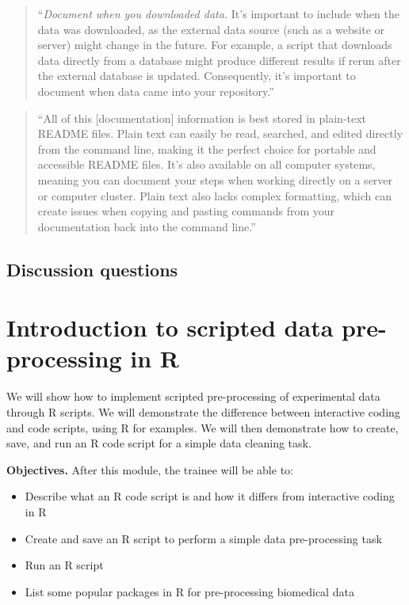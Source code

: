 \documentclass[]{tufte-book}
\providecommand{\tightlist}{%
  \setlength{\itemsep}{0pt}\setlength{\parskip}{0pt}}
\begin{document}
\begin{quote}
``\emph{Document when you downloaded data.} It's important to include when the data was downloaded,
as the external data source (such as a website or server) might change in the future. For example,
a script that downloads data directly from a database might produce different results if
rerun after the external database is updated. Consequently, it's important to document
when data came into your repository.'' \citep{buffalo2015bioinformatics}
\end{quote}

\begin{quote}
``All of this {[}documentation{]} information is best stored in plain-text README files.
Plain text can easily be read, searched, and edited directly from the command line,
making it the perfect choice for portable and accessible README files. It's also available
on all computer systems, meaning you can document your steps when working directly on
a server or computer cluster. Plain text also lacks complex formatting, which can create
issues when copying and pasting commands from your documentation back into the command
line.'' \citep{buffalo2015bioinformatics}
\end{quote}

\hypertarget{discussion-questions}{%
\subsection{Discussion questions}\label{discussion-questions}}

\hypertarget{introduction-to-scripted-data-pre-processing-in-r}{%
\section{Introduction to scripted data pre-processing in R}\label{introduction-to-scripted-data-pre-processing-in-r}}

We will show how to implement scripted pre-processing of experimental data
through R scripts. We will demonstrate the difference between interactive coding
and code scripts, using R for examples. We will then demonstrate how to create,
save, and run an R code script for a simple data cleaning task.

\textbf{Objectives.} After this module, the trainee will be able to:

\begin{itemize}
\tightlist
\item
  Describe what an R code script is and how it differs from interactive
  coding in R
\item
  Create and save an R script to perform a simple data pre-processing task
\item
  Run an R script
\item
  List some popular packages in R for pre-processing biomedical data
\end{itemize}
\end{document}
